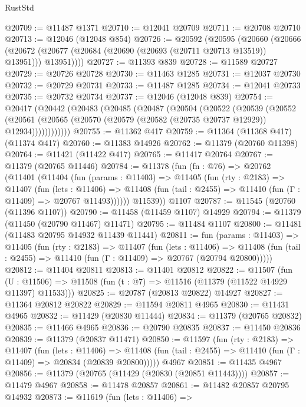 \begin{lexlean}{RustStd}
\begin{coremodule}
@20709 := @11487 @1371
@20710 := @12041 @20709
@20711 := @20708 @20710
@20713 := @12046 (@12048 @854)
@20726 := @20592
    (@20595
      (@20660
        (@20666 (@20672 (@20677 (@20684 (@20690 (@20693 (@20711 @20713 @13519)) @13951))) @13951))))
@20727 := @11393 @839
@20728 := @11589 @20727
@20729 := @20726 @20728
@20730 := @11463 @1285
@20731 := @12037 @20730
@20732 := @20729 @20731
@20733 := @11487 @1285
@20734 := @12041 @20733
@20735 := @20732 @20734
@20737 := @12046 (@12048 @839)
@20754 := @20417
    (@20442
      (@20483
        (@20485
          (@20487
            (@20504
              (@20522
                (@20539
                  (@20552
                    (@20561
                      (@20565 (@20570 (@20579 (@20582 (@20735 @20737 @12929)) @12934))))))))))))
@20755 := @11362 @417
@20759 := @11364 (@11368 @417) (@11374 @417)
@20760 := @11383 @14926
@20762 := @11379 (@20760 @11398)
@20764 := @11421 (@11422 @417)
@20765 := @11417 @20764
@20767 := @11379 (@20765 @11446)
@20784 := @11378
    (fun (fn : @76) =>
    @20762
      (@11401
        (@11404
          (fun (params : @11403) =>
          @11405
            (fun (rty : @2183) =>
            @11407
              (fun (lets : @11406) =>
              @11408 (fun (tail : @2455) => @11410 (fun (Γ : @11409) => @20767 @11493))))))
        @11539))
    @1107
@20787 := @11545 (@20760 (@11396 @1107))
@20790 := @11458 (@11459 @1107) @14929
@20794 := @11379 (@11450 (@20790 @11467) @11471)
@20795 := @11484 @1107
@20800 := @11481 (@11483 @20795 @14932 @11439 @11441)
@20811 := fun (params : @11403) =>
  @11405
    (fun (rty : @2183) =>
    @11407
      (fun (lets : @11406) =>
      @11408 (fun (tail : @2455) => @11410 (fun (Γ : @11409) => @20767 (@20794 @20800)))))
@20812 := @11404 @20811
@20813 := @11401 @20812
@20822 := @11507
    (fun (U : @11506) => @11508 (fun (t : @7) => @11516 (@11379 (@11522 @14929 @11397) @11533)))
@20825 := @20787 (@20813 @20822) @14927
@20827 := @11364 @20812 @20822
@20829 := @11594 @20811 @4965
@20830 := @11431 @4965
@20832 := @11429 (@20830 @11444)
@20834 := @11379 (@20765 @20832)
@20835 := @11466 @4965
@20836 := @20790 @20835
@20837 := @11450 @20836
@20839 := @11379 (@20837 @11471)
@20850 := @11597
    (fun (rty : @2183) =>
    @11407
      (fun (lets : @11406) =>
      @11408 (fun (tail : @2455) => @11410 (fun (Γ : @11409) => @20834 (@20839 @20800)))))
    @4967
@20851 := @11435 @4967
@20856 := @11379 (@20765 (@11429 (@20830 (@20851 @11443))))
@20857 := @11479 @4967
@20858 := @11478 @20857
@20861 := @11482 @20857 @20795 @14932
@20873 := @11619
    (fun (lets : @11406) =>

\end{coremodule}
\end{lexlean}
